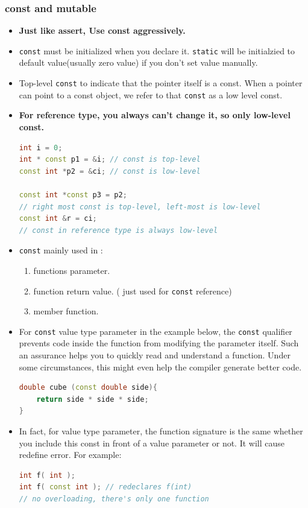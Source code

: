 \documentclass[a4paper,12pt,twoside]{book}
\begin{document}
\subsubsection{const and mutable}
\begin{itemize}
\item \textbf{Just like assert, Use const aggressively.}

\item \texttt{const} must be initialized when you declare it. \texttt{static} will be initialzied to default value(usually zero value) if you don't set value manually. 

\item Top-level \texttt{const} to indicate that the pointer itself is a const. When a pointer can point to a const object, we refer to that \texttt{const} as a low level const.

\item \textbf{For reference type, you always can't change it, so only low-level const.}
\begin{lstlisting}[frame=single, language=c++]
int i = 0;
int * const p1 = &i; // const is top-level
const int *p2 = &ci; // const is low-level

const int *const p3 = p2;
// right most const is top-level, left-most is low-level
const int &r = ci;
// const in reference type is always low-level
\end{lstlisting}


\item \texttt{const} mainly used in :
\begin{enumerate}
\item functions parameter.
\item function return value. ( just used for \texttt{const} reference)
\item member function.
\end{enumerate}

\item For \texttt{const} value type parameter in the example below, the \texttt{const} qualifier prevents code inside the function from modifying the parameter itself. Such an assurance helps you to quickly read and understand a function. Under some circumstances, this might even help the compiler generate better code. 
\begin{lstlisting}[frame=single, language=c++]
double cube (const double side){
    return side * side * side;
}
\end{lstlisting}

\item In fact, for value type parameter, the function signature is the same whether you include this const in front of a value parameter or not. It will cause redefine error. For example:
\begin{lstlisting}[frame=single, language=c++]
int f( int );
int f( const int ); // redeclares f(int)
// no overloading, there's only one function
\end{lstlisting}


\end{itemize}
\end{document}
